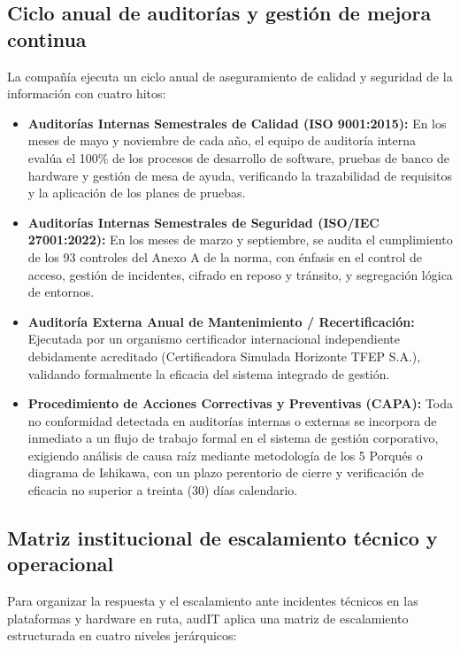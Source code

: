 \subsection{Ciclo anual de auditorías y gestión de mejora continua}\label{sec:1-auditorias}

La compañía ejecuta un ciclo anual de aseguramiento de calidad y seguridad de la información con cuatro hitos:

\begin{itemize}
  \item \textbf{Auditorías Internas Semestrales de Calidad (ISO 9001:2015):} En los meses de mayo y noviembre de cada año, el equipo de auditoría interna evalúa el 100\% de los procesos de desarrollo de software, pruebas de banco de hardware y gestión de mesa de ayuda, verificando la trazabilidad de requisitos y la aplicación de los planes de pruebas.
  \item \textbf{Auditorías Internas Semestrales de Seguridad (ISO/IEC 27001:2022):} En los meses de marzo y septiembre, se audita el cumplimiento de los 93 controles del Anexo A de la norma, con énfasis en el control de acceso, gestión de incidentes, cifrado en reposo y tránsito, y segregación lógica de entornos.
  \item \textbf{Auditoría Externa Anual de Mantenimiento / Recertificación:} Ejecutada por un organismo certificador internacional independiente debidamente acreditado (Certificadora Simulada Horizonte TFEP S.A.), validando formalmente la eficacia del sistema integrado de gestión.
  \item \textbf{Procedimiento de Acciones Correctivas y Preventivas (CAPA):} Toda no conformidad detectada en auditorías internas o externas se incorpora de inmediato a un flujo de trabajo formal en el sistema de gestión corporativo, exigiendo análisis de causa raíz mediante metodología de los 5 Porqués o diagrama de Ishikawa, con un plazo perentorio de cierre y verificación de eficacia no superior a treinta (30) días calendario.
\end{itemize}

\subsection{Matriz institucional de escalamiento técnico y operacional}\label{sec:1-escalamiento}

Para organizar la respuesta y el escalamiento ante incidentes técnicos en las plataformas y hardware en ruta, audIT aplica una matriz de escalamiento estructurada en cuatro niveles jerárquicos:

